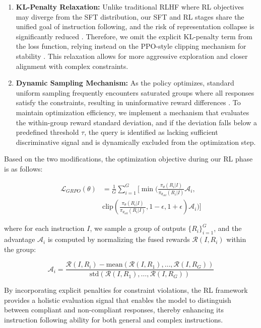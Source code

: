 \begin{enumerate}[leftmargin=4mm]
    \item \textbf{KL-Penalty Relaxation:} Unlike traditional RLHF where RL objectives may diverge from the SFT distribution, our SFT and RL stages share the unified goal of instruction following, and the risk of representation collapse is significantly reduced \citep{parthasarathi2025grpolambdacreditassignmentimproves}. Therefore, we omit the explicit KL-penalty term from the loss function, relying instead on the PPO-style clipping mechanism for stability \citep{hu2025openreasonerzeroopensourceapproach}. This relaxation allows for more aggressive exploration and closer alignment with complex constraints.
    \item \textbf{Dynamic Sampling Mechanism:} As the policy optimizes, standard uniform sampling frequently encounters saturated groups where all responses satisfy the constraints, resulting in uninformative reward differences \citep{yu2025dapo}. To maintain optimization efficiency, we implement a mechanism that evaluates the within-group reward standard deviation, and if the deviation falls below a predefined threshold $\tau$, the query is identified as lacking sufficient discriminative signal and is dynamically excluded from the optimization step.
\end{enumerate}

Based on the two modifications, the optimization objective during our RL phase is as follows:

\begin{equation}
\begin{split}
\mathcal{L}_{GRPO}(\theta) & = \frac{1}{G} \sum_{i=1}^{G} \bigg[ \min \Big( \frac{\pi_{\theta}(R_i|I)}{\pi_{\theta_{old}}(R_i|I)} \mathcal{A}_i, \\
& \text{clip}\left( \frac{\pi_{\theta}(R_i|I)}{\pi_{\theta_{old}}(R_i|I)}, 1-\epsilon, 1+\epsilon \right) \mathcal{A}_i \Big) \bigg]
\end{split}
\end{equation}

\noindent where for each instruction $I$, we sample a group of outputs $\{R_i\}_{i=1}^G$, and the advantage $\mathcal{A}_i$ is computed by normalizing the fused rewards $\mathcal{R}(I, R_i)$ within the group:

\begin{equation}
\mathcal{A}_i = \frac{\mathcal{R}(I, R_i) - \text{mean}(\mathcal{R}(I, R_1), \dots, \mathcal{R}(I, R_G))}{\text{std}(\mathcal{R}(I, R_1), \dots, \mathcal{R}(I, R_G))}
\end{equation}

By incorporating explicit penalties for constraint violations, the RL framework provides a holistic evaluation signal that enables the model to distinguish between compliant and non-compliant responses, thereby enhancing its instruction following ability for both general and complex instructions.